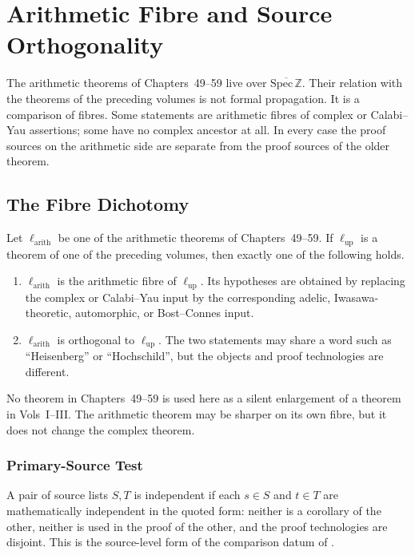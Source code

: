\chapter{Arithmetic Fibre and Source Orthogonality}
\label{v4-arith:w6-i:chapter}

\newcommand{\priorclaim}[1]{\emph{#1}}

The arithmetic theorems of Chapters~49--59 live over
\(\overline{\mathrm{Spec}\,\mathbb Z}\).  Their relation with the
theorems of the preceding volumes is not formal propagation.  It is a
comparison of fibres.  Some statements are arithmetic fibres of
complex or Calabi--Yau assertions; some have no complex ancestor at
all.  In every case the proof sources on the arithmetic side are
separate from the proof sources of the older theorem.

\section{The Fibre Dichotomy}
\label{v4-arith:w6-i:purpose}

Let \(\ell_{\mathrm{arith}}\) be one of the arithmetic theorems of
Chapters~49--59.  If \(\ell_{\mathrm{up}}\) is a theorem of one of
the preceding volumes, then exactly one of the following holds.

\begin{enumerate}
\item \(\ell_{\mathrm{arith}}\) is the arithmetic fibre of
\(\ell_{\mathrm{up}}\).  Its hypotheses are obtained by replacing the
complex or Calabi--Yau input by the corresponding adelic,
Iwasawa-theoretic, automorphic, or Bost--Connes input.
\item \(\ell_{\mathrm{arith}}\) is orthogonal to
\(\ell_{\mathrm{up}}\).  The two statements may share a word such as
``Heisenberg'' or ``Hochschild'', but the objects and proof
technologies are different.
\end{enumerate}

No theorem in Chapters~49--59 is used here as a silent enlargement of
a theorem in Vols~I--III.  The arithmetic theorem may be sharper on
its own fibre, but it does not change the complex theorem.

\subsection{Primary-Source Test}
\label{v4-arith:w6-i:comparison-criterion}

A pair of source lists \(S,T\) is independent if each
\(s\in S\) and \(t\in T\) are mathematically independent in the
quoted form: neither is a corollary of the other, neither is used in
the proof of the other, and the proof technologies are disjoint.  This
is the source-level form of the comparison datum of
.

